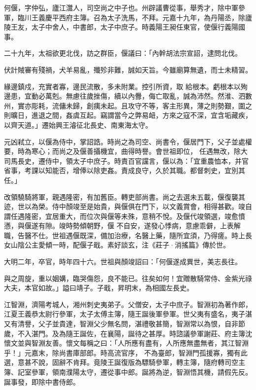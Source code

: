 \begin{pinyinscope}
 何偃，字仲弘，廬江灊人，司空尚之中子也。州辟議曹從事，舉秀才，除中軍參軍，臨川王義慶平西府主簿。召為太子洗馬，不拜。元嘉十九年，為丹陽丞，除廬陵王友，太子中舍人，中書郎，太子中庶子。時義陽王昶任東官，使偃行義陽國事。



 二十九年，太祖欲更北伐，訪之群臣，偃議曰：「內幹胡法宗宣詔，逮問北伐。



 伏計賊審有殘禍，犬羊易亂，殲殄非難，誠如天旨。今雖廟算無遺，而士未精習。



 緣邊鎮戍，充實者寡，邊民流散，多未附業。控引所資，取
 給根本。虧根本以殉邊患，宜動必萬剋。無慮往歲挫傷，續以內釁，侮亡取亂，誠為沛然。然淮、泗數州，實亦彫耗，流傭未歸，創痍未起。且攻守不等，客主形異，薄之則勢艱，圍之則曠日，進退之間，姦虞互起。竊謂當今之弊易衄，方來之寇不深，宜含垢藏疾，以齊天道。」遷始興王濬征北長史、南東海太守。



 元凶弒立，以偃為侍中，掌詔誥。時尚之為司空、尚書令，偃居門下，父子並處權要，時為寒心；而尚之及偃善攝機宜，曲得時譽。會世祖即位，
 任遇無改，除大司馬長史，遷侍中，領太子中庶子。時責百官讜言，偃以為：「宜重農恤本，并官省事，考課以知能否，增俸以除吏姦。責成良守，久於其職。都督刺史，宜別其任。」



 改領驍騎將軍，親遇隆密，有加舊臣。轉吏部尚書。尚之去選未五載，偃復襲其迹，世以為榮。侍中顏竣至是始貴，與偃俱在門下，以文義賞會，相得甚歡。竣自謂任遇隆密，宜居重大，而位次與偃等未殊，意稍不悅。及偃代竣領選，竣愈憤懣，與偃遂有隙。竣時勢傾朝野，偃
 不自安，遂發心悸病，意慮乖僻，上表解職，告醫不仕。世祖遇偃既深，備加治療，名醫上藥，隨所宜須，乃得瘥。時上長女山陰公主愛傾一時，配偃子戢。素好談玄，注《莊子·消搖篇》傳於世。



 大明二年，卒官，時年四十六。世祖與顏竣詔曰：「何偃遂成異世，美志長往。



 與之周旋，重以姻媾，臨哭傷怨，良不能已。往矣如何！宜贈散騎常侍、金紫光祿大夫，本官如故。」謚曰靖子。子戢，昇明末，為相國左長史。



 江智淵，濟陽考城人，湘州刺史夷弟子。父僧安，太子中庶子。智淵初為著作郎，江夏王義恭太尉行參軍，太子太傅主簿，隨王誕後軍參軍。世父夷有盛名，夷子湛又有清譽，父子並貴達，智淵父少無名問，湛禮敬甚簡，智淵常以為恨，自非節歲，不入湛門。及為隨王誕佐，在襄陽，誕待之甚厚。時諮議參軍謝莊、府主簿沈懷文並與智淵友善。懷文每稱之曰：「人所應有盡有，人所應無盡無者，其江智淵乎！」元嘉末，除尚書庫部郎。時高流官序，
 不為臺郎，智淵門孤援寡，獨有此選，意甚不說，固辭不肯拜。竟陵王誕復版為驃騎參軍，轉主簿，隨府轉司空主簿、記室參軍，領南濮陽太守，遷從事中郎。誕將為逆，智淵悟其機，請假先反。誕事發，即除中書侍郎。




\end{pinyinscope}
